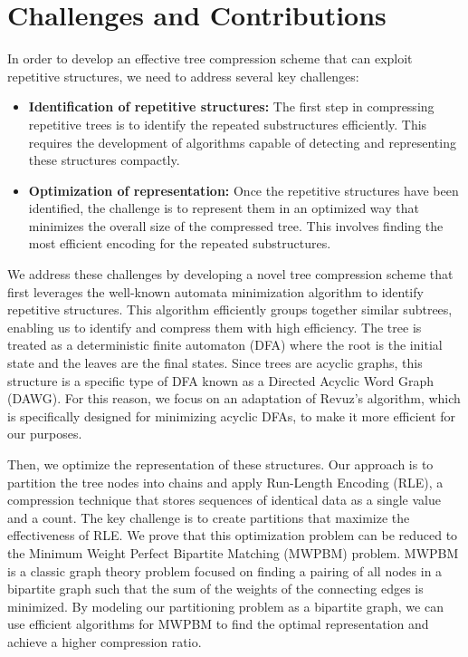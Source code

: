 \section{Challenges and Contributions}
In order to develop an effective tree compression scheme that can exploit repetitive structures, we need to address several key challenges:
\begin{itemize}
    \item \textbf{Identification of repetitive structures:} The first step in compressing repetitive trees is to identify the repeated substructures efficiently. This requires the development of algorithms capable of detecting and representing these structures compactly.
    \item \textbf{Optimization of representation:} Once the repetitive structures have been identified, the challenge is to represent them in an optimized way that minimizes the overall size of the compressed tree. This involves finding the most efficient encoding for the repeated substructures.
\end{itemize}

We address these challenges by developing a novel tree compression scheme that first leverages the well-known automata minimization algorithm to identify repetitive structures. This algorithm efficiently groups together similar subtrees, enabling us to identify and compress them with high efficiency. The tree is treated as a deterministic finite automaton (DFA) where the root is the initial state and the leaves are the final states. Since trees are acyclic graphs, this structure is a specific type of DFA known as a Directed Acyclic Word Graph (DAWG). For this reason, we focus on an adaptation of Revuz's algorithm, which is specifically designed for minimizing acyclic DFAs, to make it more efficient for our purposes.

Then, we optimize the representation of these structures. Our approach is to partition the tree nodes into chains and apply Run-Length Encoding (RLE), a compression technique that stores sequences of identical data as a single value and a count. The key challenge is to create partitions that maximize the effectiveness of RLE. We prove that this optimization problem can be reduced to the Minimum Weight Perfect Bipartite Matching (MWPBM) problem. MWPBM is a classic graph theory problem focused on finding a pairing of all nodes in a bipartite graph such that the sum of the weights of the connecting edges is minimized. By modeling our partitioning problem as a bipartite graph, we can use efficient algorithms for MWPBM to find the optimal representation and achieve a higher compression ratio.

